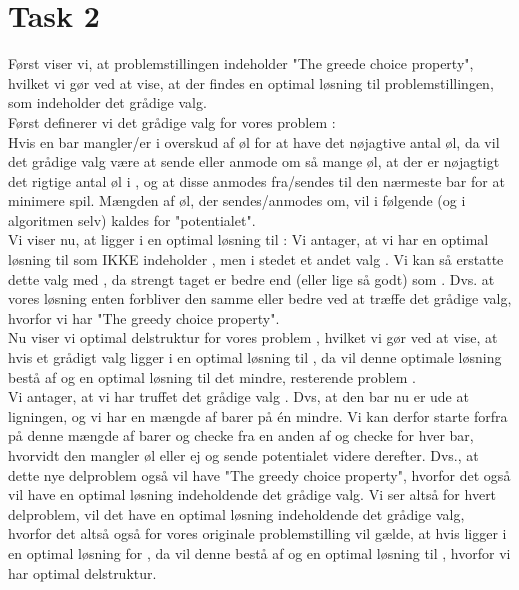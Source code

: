 \section{Task 2}

Først viser vi, at problemstillingen indeholder "The greede choice property", hvilket vi gør ved at vise, at der findes en optimal løsning til problemstillingen, som indeholder det grådige valg.\\
Først definerer vi det grådige valg  for vores problem :\\
Hvis en bar  mangler/er i overskud af  øl for at have det nøjagtive antal øl, da vil det grådige valg være at sende eller anmode om så mange øl, at der er nøjagtigt det rigtige antal øl i , og at disse anmodes fra/sendes til den nærmeste bar for at minimere spil. Mængden af øl, der sendes/anmodes om, vil i følgende (og i algoritmen selv) kaldes for "potentialet".\\
Vi viser nu, at  ligger i en optimal løsning til :
Vi antager, at vi har en optimal løsning til  som IKKE indeholder , men i stedet et andet valg . Vi kan så erstatte dette valg  med , da  strengt taget er bedre end (eller lige så godt) som . Dvs. at vores løsning enten forbliver den samme eller bedre ved at træffe det grådige valg, hvorfor vi har "The greedy choice property".\\
Nu viser vi optimal delstruktur for vores problem , hvilket vi gør ved at vise, at hvis et grådigt valg  ligger i en optimal løsning til , da vil denne optimale løsning bestå af  og en optimal løsning til det mindre, resterende problem .\\
Vi antager, at vi har truffet det grådige valg .
Dvs, at den bar nu er ude at ligningen, og vi har en mængde af barer på én mindre. Vi kan derfor starte forfra på denne mængde af barer og checke fra en anden af og checke for hver bar, hvorvidt den mangler øl eller ej og sende potentialet videre derefter. Dvs., at dette nye delproblem  også vil have "The greedy choice property", hvorfor det også vil have en optimal løsning indeholdende det grådige valg. Vi ser altså for hvert delproblem, vil det have en optimal løsning indeholdende det grådige valg, hvorfor det altså også for vores originale problemstilling  vil gælde, at hvis  ligger i en optimal løsning for , da vil denne bestå af  og en optimal løsning til , hvorfor vi har optimal delstruktur.

